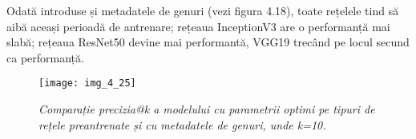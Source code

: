 Odată introduse și metadatele de genuri (vezi figura 4.18), toate rețelele tind să aibă aceași perioadă de antrenare; rețeaua InceptionV3 are o performanță mai slabă; rețeaua ResNet50 devine mai performantă, VGG19 trecând pe locul secund ca performanță. 
\begin{figure}[!h]
	\centering
	\texttt{[image: img\_4\_25]}
	\caption[Comparație precizia@k a modelului cu parametrii optimi pe tipuri de rețele preantrenate și cu metadatele de genuri]{\textit{Comparație precizia@k a modelului cu parametrii optimi pe tipuri de rețele preantrenate și cu metadatele de genuri, unde k=10.}}
\end{figure}